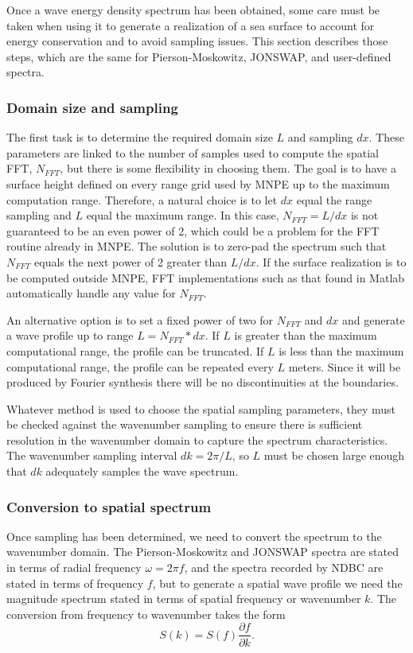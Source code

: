 Once a wave energy density spectrum has been obtained, some care must be taken when using it to generate a realization of a sea surface to account for energy conservation and to avoid sampling issues\cite{Mobley}. This section describes those steps, which are the same for Pierson-Moskowitz, JONSWAP, and user-defined spectra.

\subsubsection{Domain size and sampling}

The first task is to determine the required domain size $L$ and sampling $dx$. These parameters are linked to the number of samples used to compute the spatial FFT, $N_{FFT}$, but there is some flexibility in choosing them. The goal is to have a surface height defined on every range grid used by MNPE up to the maximum computation range. Therefore, a natural choice is to let $dx$ equal the range sampling and $L$ equal the maximum range. In this case, $N_{FFT}=L/dx$ is not guaranteed to be an even power of 2, which could be a problem for the FFT routine already in MNPE. The solution is to zero-pad the spectrum such that $N_{FFT}$ equals the next power of 2 greater than $L/dx$. If the surface realization is to be computed outside MNPE, FFT implementations such as that found in Matlab automatically handle any value for $N_{FFT}$.

An alternative option is to set a fixed power of two for $N_{FFT}$ and $dx$ and generate a wave profile up to range $L=N_{FFT}*dx$. If $L$ is greater than the maximum computational range, the profile can be truncated. If $L$ is less than the maximum computational range, the profile can be repeated every $L$ meters. Since it will be produced by Fourier synthesis there will be no discontinuities at the boundaries.

Whatever method is used to choose the spatial sampling parameters, they must be checked against the wavenumber sampling to ensure there is sufficient resolution in the wavenumber domain to capture the spectrum characteristics. The wavenumber sampling interval $dk=2\pi/L$, so $L$ must be chosen large enough that $dk$ adequately samples the wave spectrum.

\subsubsection{Conversion to spatial spectrum}

Once sampling has been determined, we need to convert the spectrum to the wavenumber domain. The Pierson-Moskowitz and JONSWAP spectra are stated in terms of radial frequency $\omega=2\pi f$, and the spectra recorded by NDBC are stated in terms of frequency $f$, but to generate a spatial wave profile we need the magnitude spectrum stated in terms of spatial frequency or wavenumber $k$. The conversion from frequency to wavenumber takes the form
\begin{equation}
S(k) = S(f)\frac{\partial f}{\partial k}.\label{eq:Sconvert}
\end{equation}

